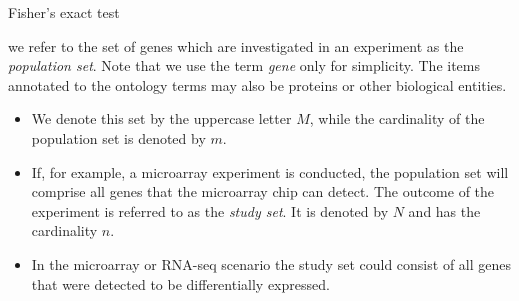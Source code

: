 \documentclass{beamer}
\begin{document}
\begin{frame}{Fisher's exact test}

 we refer to the set of genes which are investigated in an experiment as the
\emph{population set}. Note that we use the term \emph{gene} only for
simplicity. The items annotated to the ontology terms may also be proteins or
other biological entities. 

\begin{itemize}
 \item We denote this set by the uppercase letter $M$,
while the cardinality of the population set is denoted by $m$.
\item  If, for example,
a microarray experiment is conducted, the population set will comprise all genes
that the microarray chip can detect. The outcome of the experiment is referred
to as the \emph{study set}. It is denoted by $N$ and has the cardinality $n$.
\item 
 In
the microarray or RNA-seq scenario the study set could consist of all genes that were
detected to be differentially expressed.
\end{itemize}

\end{frame}
\end{document}
